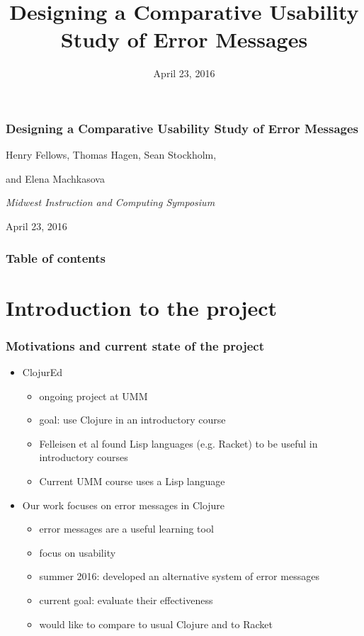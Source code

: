 \documentclass{beamer}
\begin{document}
\title{Designing a Comparative Usability Study of Error Messages}
\date{April 23, 2016}

\begin{frame}
\frametitle{Designing a Comparative Usability Study of Error Messages}
{\centering
\noindent
Henry Fellows, Thomas Hagen, Sean Stockholm, \par
and Elena Machkasova \par

{\it 
Midwest Instruction and Computing Symposium\par
April 23, 2016\par}
}
\end{frame}

\begin{frame}
\frametitle{Table of contents}
\tableofcontents  
\end{frame}

\section{Introduction to the project}

\begin{frame}
\frametitle{Motivations and current state of the project}
	\begin{itemize}
		\item ClojurEd
			\begin{itemize}
				\item ongoing project at UMM
				\item goal: use Clojure in an introductory course
				\item Felleisen et al found Lisp languages (e.g. Racket) to be useful in introductory courses
				\item Current UMM course uses a Lisp language 
			\end{itemize}
		\item Our work focuses on error messages in Clojure
			\begin{itemize}
				\item error messages are a useful learning tool
				\item focus on usability
				\item summer 2016: developed an alternative system of error messages
				\item current goal: evaluate their effectiveness
				\item would like to compare to usual Clojure and to Racket
			\end{itemize}
	\end{itemize}
\end{frame}
\end{document}
